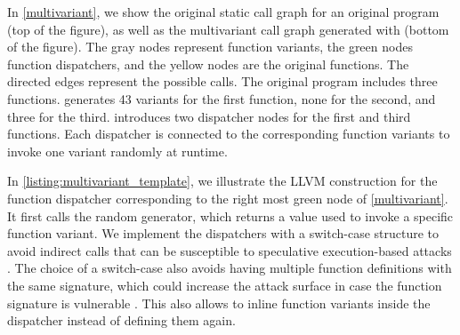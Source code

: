 In \autoref{multivariant}, we show the original static call graph for an original program (top of the figure), as well as the multivariant call graph generated with \tool (bottom of the figure).
The gray nodes represent function variants, the green nodes function dispatchers, and the yellow nodes are the original functions.
The directed edges represent the possible calls.
The original program includes three functions. \tool generates 43 variants for the first function, none for the second, and three for the third. 
\tool introduces two dispatcher nodes for the first and third functions. Each dispatcher is connected to the corresponding function variants to invoke one variant randomly at runtime.


In  \autoref{listing:multivariant_template}, we illustrate the LLVM construction for the function dispatcher corresponding to the right most green node of \autoref{multivariant}.
It first calls the random generator, which returns a value used to invoke a specific function variant. 
We implement the dispatchers with a switch-case structure to avoid indirect calls that can be susceptible to speculative execution-based attacks \cite{Narayan2021Swivel}. 
The choice of a switch-case also avoids having multiple function definitions with the same signature, which could increase the attack surface in case the function signature is vulnerable \cite{johnson2021}.
This also allows \tool to inline function variants inside the dispatcher instead of defining them again.

\lstset{
    language=llvm,
    basicstyle=\footnotesize\ttfamily,
    columns=fullflexible,
    breaklines=true,
    numbers=none,
    stepnumber=1,
    float
}

